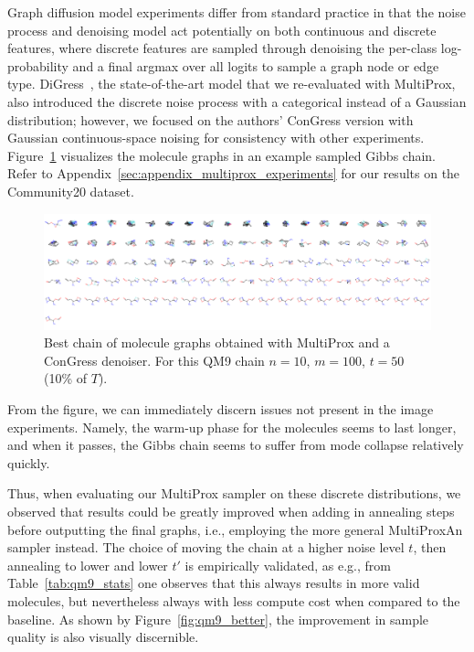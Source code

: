 Graph diffusion model experiments differ from standard practice in that the noise process and denoising model act potentially on both continuous and discrete features, where discrete features are sampled through denoising the per-class log-probability and a final argmax over all logits to sample a graph node or edge type. DiGress~\cite{vignac_digress_2022}, the state-of-the-art model that we re-evaluated with MultiProx, also introduced the discrete noise process with a categorical instead of a Gaussian distribution; however, we focused on the authors' ConGress version with Gaussian continuous-space noising for consistency with other experiments. Figure~\ref{fig:multiprox_qm9} visualizes the molecule graphs in an example sampled Gibbs chain. Refer to Appendix~\ref{sec:appendix_multiprox_experiments} for our results on the Community20 dataset. 

\begin{figure}[H]
    \centering
    \includegraphics[width=\linewidth]{figures/multiprox/qm9_grid_image_single_noise.png}
    \caption[Best chain of molecule graphs obtained with MultiProx.]{Best chain of molecule graphs obtained with MultiProx and a ConGress denoiser. For this QM9 chain $n=10$, $m=100$, $t=50$ (10\% of $T$).
    }
    \label{fig:multiprox_qm9}
\end{figure}

From the figure, we can immediately discern issues not present in the image experiments. Namely, the warm-up phase for the molecules seems to last longer, and when it passes, the Gibbs chain seems to suffer from mode collapse relatively quickly.

Thus, when evaluating our MultiProx sampler on these discrete distributions, we observed that results could be greatly improved when adding in annealing steps before outputting the final graphs, i.e., employing the more general MultiProxAn sampler instead. The choice of moving the chain at a higher noise level $t$, then annealing to lower and lower $t'$ is empirically validated, as e.g., from Table~\ref{tab:qm9_stats} one observes that this always results in more valid molecules, but nevertheless always with less compute cost when compared to the baseline. As shown by Figure~\ref{fig:qm9_better}, the improvement in sample quality is also visually discernible. 

